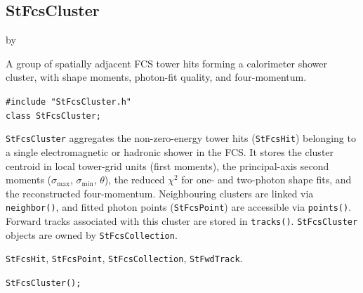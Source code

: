 \documentclass[twoside]{article}
\newcommand{\entrylabel}[1]{\mbox{\textbf{{#1}}}\hfil}%
\newenvironment{entry}
{\begin{list}{}%
    {\renewcommand{\makelabel}{\entrylabel}%
     \setlength{\labelwidth}{90pt}%
     \setlength{\leftmargin}{\labelwidth}
     \advance\leftmargin by \labelsep%
      }%
    }%
  {\end{list}}
\newcommand{\Entrylabel}[1]%
{\raisebox{0pt}[1ex][0pt]{\makebox[\labelwidth][l]%
    {\parbox[t]{\labelwidth}{\hspace{0pt}\textbf{{#1}}}}}}
\newenvironment{Entry}%
{\renewcommand{\entrylabel}{\Entrylabel}\begin{entry}}%
  {\end{entry}}
\begin{document}
\subsection{StFcsCluster}
\label{sec:StFcsCluster}
\begin{Entry}
\item[Summary]
    A group of spatially adjacent FCS tower hits forming a calorimeter shower
    cluster, with shape moments, photon-fit quality, and four-momentum.

\item[Synopsis]
    \verb+#include "StFcsCluster.h"+\\
    \verb+class StFcsCluster;+\\

\item[Description]
    \texttt{StFcsCluster} aggregates the non-zero-energy tower hits
    (\texttt{StFcsHit}) belonging to a single electromagnetic or hadronic
    shower in the FCS.  It stores the cluster centroid in local tower-grid
    units (first moments), the principal-axis second moments
    ($\sigma_{\max}$, $\sigma_{\min}$, $\theta$), the reduced $\chi^{2}$ for
    one- and two-photon shape fits, and the reconstructed four-momentum.
    Neighbouring clusters are linked via \texttt{neighbor()}, and fitted
    photon points (\texttt{StFcsPoint}) are accessible via \texttt{points()}.
    Forward tracks associated with this cluster are stored in
    \texttt{tracks()}.  \texttt{StFcsCluster} objects are owned by
    \texttt{StFcsCollection}.

\item[Related Classes]
    \texttt{StFcsHit}, \texttt{StFcsPoint}, \texttt{StFcsCollection},
    \texttt{StFwdTrack}.

\item[Public\\ Constructors]
    \verb+StFcsCluster();+\\


\end{Entry}
\end{document}
